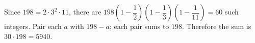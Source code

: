 Since $198=2\cdot3^2\cdot11$, there are $198(1-\dfrac{1}{2})(1-\dfrac{1}{3})(1-\dfrac{1}{11})=60$ such integers. Pair each $a$ with $198-a$; each pair sums to $198$. Therefore the sum is $30\cdot198=\boxed{5940}$.
